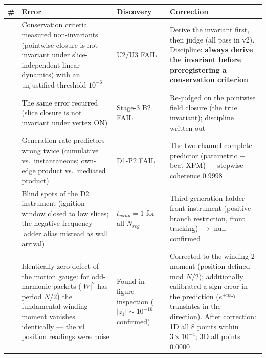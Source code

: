 \documentclass[
  a4paper,
]{article}
\newcounter{none} %
\begin{document}
{\def\LTcaptype{none} %
\begin{longtable}[]{@{}
  >{\raggedright\arraybackslash}p{}
  >{\raggedright\arraybackslash}p{}
  >{\raggedright\arraybackslash}p{}
  >{\raggedright\arraybackslash}p{}@{}}
\toprule\noalign{}
\begin{minipage}[b]{\linewidth}\raggedright
\#
\end{minipage} & \begin{minipage}[b]{\linewidth}\raggedright
Error
\end{minipage} & \begin{minipage}[b]{\linewidth}\raggedright
Discovery
\end{minipage} & \begin{minipage}[b]{\linewidth}\raggedright
Correction
\end{minipage} \\
\midrule\noalign{}
\endhead
\bottomrule\noalign{}
\endlastfoot
1 & Conservation criteria measured non-invariants (pointwise closure is
not invariant under slice-independent linear dynamics) with an
unjustified threshold \(10^{-6}\) & U2/U3 FAIL & Derive the invariant
first, then judge (all pass in v2). Discipline: \textbf{always derive
the invariant before preregistering a conservation criterion} \\
2 & The same error recurred (slice closure is not invariant under vertex
ON) & Stage-3 B2 FAIL & Re-judged on the pointwise field closure (the
true invariant); discipline written out \\
3 & Generation-rate predictors wrong twice (cumulative
vs.~instantaneous; own-edge product vs.~mediated product) & D1-P2 FAIL &
The two-channel complete predictor (parametric + beat-XPM) --- stepwise
coherence 0.9998 \\
4 & Blind spots of the D2 instrument (ignition window closed to low
slices; the negative-frequency ladder alias misread as wall arrival) &
\(t_{wrap}=1\) for all \(N_{reg}\) & Third-generation ladder-front
instrument (positive-branch restriction, front tracking) \(\to\) null
confirmed \\
5 & Identically-zero defect of the motion gauge: for odd-harmonic
packets (\(|W|^2\) has period \(N/2\)) the fundamental winding moment
vanishes identically --- the v1 position readings were noise & Found in
figure inspection (\(|z_1|\sim10^{-16}\) confirmed) & Corrected to the
winding-2 moment (position defined mod \(N/2\)); additionally calibrated
a sign error in the prediction (\(e^{+ik\omega_1}\) translates in the
\(-\) direction). After correction: 1D all 8 points within
\(3\times10^{-4}\); 3D all points 0.0000 \\
\end{longtable}
}
\end{document}
